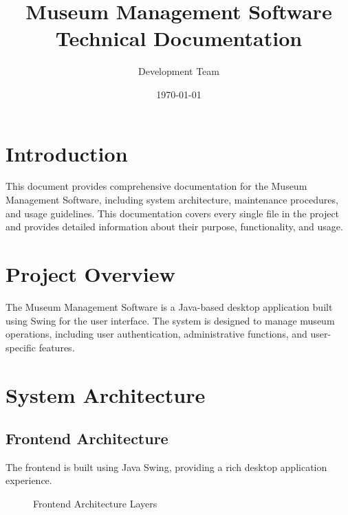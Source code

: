 \documentclass[12pt,a4paper]{article}
\title{Museum Management Software\\Technical Documentation}
\author{Development Team}
\date{\today}
\begin{document}
\maketitle
\tableofcontents
\newpage

\section{Introduction}
This document provides comprehensive documentation for the Museum Management Software, including system architecture, maintenance procedures, and usage guidelines. This documentation covers every single file in the project and provides detailed information about their purpose, functionality, and usage.

\section{Project Overview}
The Museum Management Software is a Java-based desktop application built using Swing for the user interface. The system is designed to manage museum operations, including user authentication, administrative functions, and user-specific features.

\section{System Architecture}

\subsection{Frontend Architecture}
The frontend is built using Java Swing, providing a rich desktop application experience.

\begin{figure}[h]
\centering
{}
\caption{Frontend Architecture Layers}
\end{figure}
\end{document}
